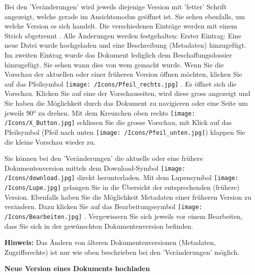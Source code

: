  Bei den 'Veränderungen' wird jeweils diejenige Version mit 'fetter' Schrift angezeigt, welche gerade im Ansichtsmodus geöffnet ist. Sie sehen ebenfalls, um welche Version es sich handelt. Die verschiedenen Einträge werden mit einem Strich abgetrennt . Alle Änderungen werden festgehalten: Erster Eintrag: Eine neue Datei wurde hochgeladen und eine Beschreibung (Metadaten) hinzugefügt. Im zweiten Eintrag wurde das Dokument lediglich dem Beschaffungsdossier hinzugefügt. Sie sehen wann dies von wem gemacht wurde. Wenn Sie die Vorschau der aktuellen oder einer früheren Version öffnen möchten, klicken Sie auf das Pfeilsymbol \texttt{[image: /Icons/Pfeil\_rechts.jpg]} . Es öffnet sich die Vorschau. Klicken Sie auf eine der Vorschauseiten, wird diese gross angezeigt und Sie haben die Möglichkeit durch das Dokument zu navigieren oder eine Seite um jeweils 90° zu drehen. Mit dem Kreuzchen oben rechts \texttt{[image: /Icons/X\_Button.jpg]} schlissen Sie die grosse Vorschau, mit Klick auf das Pfeilsymbol (Pfeil nach unten \texttt{[image: /Icons/Pfeil\_unten.jpg]}) klappen Sie die kleine Vorschau wieder zu.

Sie können bei den 'Veränderungen' die aktuelle oder eine frühere Dokumentenversion mittels dem Download-Symbol \texttt{[image: /Icons/download.jpg]}  direkt herunterladen. Mit dem Lupensymbol \texttt{[image: /Icons/Lupe.jpg]}  gelangen Sie in die Übersicht der entsprechenden (frühere) Version. Ebenfalls haben Sie die Möglichkeit Metadaten einer früheren Version zu verändern. Dazu klicken Sie auf das Bearbeitungssymbol \texttt{[image: /Icons/Bearbeiten.jpg]} . Vergewissern Sie sich jeweils vor einem Bearbeiten, dass Sie sich in der gewünschten Dokumentenversion befinden.

\vspace{\baselineskip}

\textbf{Hinweis:} Das Ändern von älteren Dokumentenversionen (Metadaten, Zugriffsrechte) ist nur wie oben beschrieben bei den 'Veränderungen' möglich.

\pagebreak

\textbf{Neue Version eines Dokuments hochladen}

\vspace{\baselineskip}

